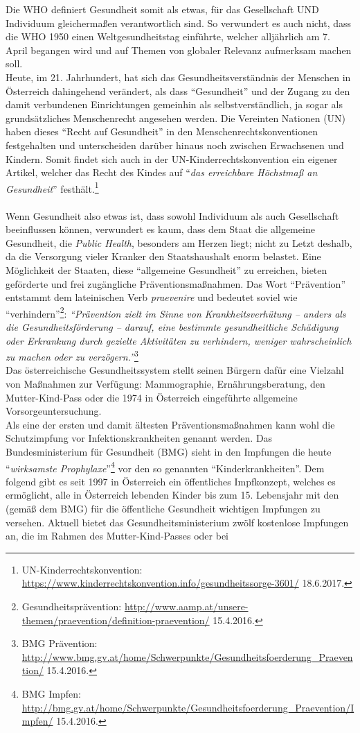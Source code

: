 \documentclass[
    a4paper,
    12pt,
    hyphens,
    chapterprefix=true,
    headheight=33pt,
    footheight=29pt,
    headings=optiontohead, %
]{scrartcl}
\begin{document}
Die WHO definiert Gesundheit somit als etwas, für das Gesellschaft UND Individuum gleichermaßen verantwortlich sind. So verwundert es auch nicht, dass die WHO 1950 einen Weltgesundheitstag einführte, welcher alljährlich am 7. April begangen wird und auf Themen von globaler Relevanz aufmerksam machen soll.\\
Heute, im 21. Jahrhundert, hat sich das Gesundheitsverständnis der Menschen in Österreich dahingehend verändert, als dass "`Gesundheit"' und der Zugang zu den damit verbundenen Einrichtungen gemeinhin als selbstverständlich, ja sogar als grundsätzliches Menschenrecht angesehen werden. Die Vereinten Nationen (UN) haben dieses "`Recht auf Gesundheit"' in den Menschenrechtskonventionen festgehalten und unterscheiden darüber hinaus noch zwischen Erwachsenen und Kindern. Somit findet sich auch in der UN-Kinderrechtskonvention ein eigener Artikel, welcher das Recht des Kindes auf "`\textit{das erreichbare Höchstmaß an Gesundheit}"' festhält.\footnote{UN-Kinderrechtskonvention: \url{https://www.kinderrechtskonvention.info/gesundheitssorge-3601/} 18.6.2017.}\\
\\
Wenn Gesundheit also etwas ist, dass sowohl Individuum als auch Gesellschaft beeinflussen können, verwundert es kaum, dass dem Staat die allgemeine Gesundheit, die \textit{Public Health}, besonders am Herzen liegt; nicht zu Letzt deshalb, da die Versorgung vieler Kranker den Staatshaushalt enorm belastet. Eine Möglichkeit der Staaten, diese "`allgemeine Gesundheit"' zu erreichen, bieten geförderte und frei zugängliche Präventionsmaßnahmen. Das Wort "`Prävention"' entstammt dem lateinischen Verb \textit{praevenire} und bedeutet soviel wie "`verhindern"'\footnote{Gesundheitsprävention: \url{http://www.aamp.at/unsere-themen/praevention/definition-praevention/} 15.4.2016.}: \textit{"`Prävention zielt im Sinne von Krankheitsverhütung
-- anders als die Gesundheitsförderung -- darauf, eine bestimmte gesundheitliche Schädigung oder Erkrankung durch gezielte Aktivitäten zu verhindern, weniger wahrscheinlich zu machen oder zu verzögern."'}\footnote{BMG Prävention: \url{http://www.bmg.gv.at/home/Schwerpunkte/Gesundheitsfoerderung\_Praevention/} 15.4.2016.}\\
Das österreichische Gesundheitssystem stellt seinen Bürgern dafür eine Vielzahl von Maßnahmen zur Verfügung: Mammographie, Ernährungsberatung, den Mutter-Kind-Pass oder die 1974 in Österreich eingeführte allgemeine Vorsorgeuntersuchung.\\
Als eine der ersten und damit ältesten Präventionsmaßnahmen kann wohl die Schutzimpfung vor Infektionskrankheiten genannt werden. Das Bundesministerium für Gesundheit (BMG) sieht in den Impfungen die heute "`\textit{wirksamste Prophylaxe}"'\footnote{BMG Impfen: \url{http://bmg.gv.at/home/Schwerpunkte/Gesundheitsfoerderung\_Praevention/Impfen/} 15.4.2016.} vor den so genannten "`Kinderkrankheiten"'. Dem folgend gibt es seit 1997 in Österreich ein öffentliches Impfkonzept, welches es ermöglicht, alle in Österreich lebenden Kinder bis zum 15. Lebensjahr mit den (gemäß dem BMG) für die öffentliche Gesundheit wichtigen Impfungen zu versehen. Aktuell bietet das Gesundheitsministerium zwölf kostenlose Impfungen an, die im Rahmen des Mutter-Kind-Passes oder bei
\end{document}
